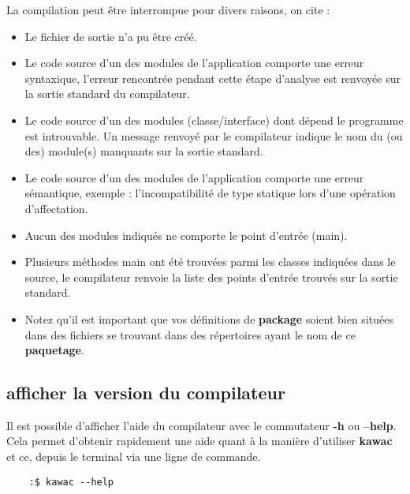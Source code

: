 \documentclass{../res/univ-projet}
\begin{document}
\begin{itemize}
      La compilation peut être interrompue pour divers raisons, on cite :
      \begin{itemize}
        \item Le fichier de sortie n’a pu être créé.
        \item Le code source d’un des modules de l’application
        comporte une erreur syntaxique, l’erreur rencontrée pendant cette
        étape d’analyse est renvoyée sur la sortie standard du compilateur.
        \item Le code source d’un des modules
        (classe/interface) dont dépend le programme est introuvable.
        Un message renvoyé par le compilateur indique le nom du (ou des)
        module(s) manquants sur la sortie standard.
        \item Le code source d’un des modules de l’application
        comporte une erreur sémantique, exemple : l’incompatibilité de type
        statique lors d’une opération d’affectation.
        \item Aucun des modules indiqués ne comporte le
        point d’entrée (main).
        \item Plusieurs méthodes main ont été trouvées parmi
        les classes indiquées dans le source, le compilateur renvoie la liste
        des points d’entrée trouvés sur la sortie standard.
        \item Notez qu'il est important que vos définitions de \textbf{package} soient bien situées
         dans des fichiers se trouvant dans des répertoires ayant le nom de ce \textbf{paquetage}.
      \end{itemize}

    \end{itemize}
  \subsection{afficher la version du compilateur}
    Il est possible d'afficher l'aide du compilateur avec le commutateur \textbf{-h} ou \textbf{--help}. Cela permet d'obtenir rapidement une aide quant à la manière d'utiliser \textbf{kawac} et ce, depuis le terminal via une ligne de commande.
  \begin{verbatim}
    :$ kawac --help
  \end{verbatim}

\newpage
\end{document}
